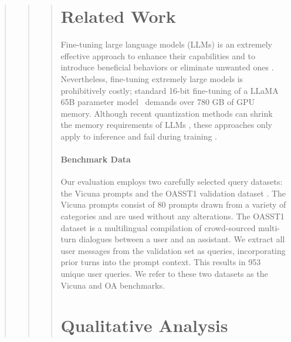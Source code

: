\begin{quote}
\begin{quote}
\begin{quote}
\section{Related Work}

Fine-tuning large language models (LLMs) is an extremely effective approach to enhance their capabilities \citep{min2021metaicl, wei2021finetuned, ouyang2022training, wang2022super, wang2022self, liu2022few} and to introduce beneficial behaviors or eliminate unwanted ones \citep{ouyang2022training,askell2021general,bai2022training}. Nevertheless, fine-tuning extremely large models is prohibitively costly; standard 16-bit fine-tuning of a LLaMA 65B parameter model~\citep{touvron2023llama} demands over 780 GB of GPU memory. Although recent quantization methods can shrink the memory requirements of LLMs \citep{dettmers2022llm, dettmers2022case, frantar2022gptq, xiao2022smoothquant}, these approaches only apply to inference and fail during training \citep{wortsman2023stable}.

\paragraph{Benchmark Data} Our evaluation employs two carefully selected query datasets: the Vicuna prompts \citep{vicuna2023} and the OASST1 validation dataset \citep{kopf2023openassistant}. The Vicuna prompts consist of 80 prompts drawn from a variety of categories and are used without any alterations. The OASST1 dataset is a multilingual compilation of crowd-sourced multi-turn dialogues between a user and an assistant. We extract all user messages from the validation set as queries, incorporating prior turns into the prompt context. This results in 953 unique user queries. We refer to these two datasets as the Vicuna and OA benchmarks.

\section{Qualitative Analysis}


\end{quote}
\end{quote}
\end{quote}
